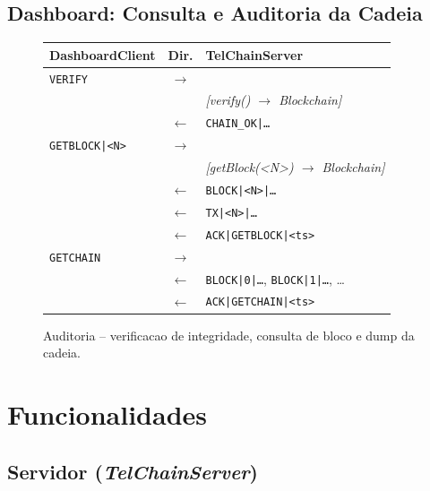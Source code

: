 \documentclass[12pt, a4paper]{article}
\begin{document}
\subsection{Dashboard: Consulta e Auditoria da Cadeia}

\begin{figure}[H]
\centering
\begin{tabular}{p{5cm} c p{5.5cm}}
\toprule
\textbf{DashboardClient} & \textbf{Dir.} & \textbf{TelChainServer} \\
\midrule
\texttt{VERIFY} & $\longrightarrow$ & \\
 & & \textit{[verify() $\to$ Blockchain]} \\
 & $\longleftarrow$ & \texttt{CHAIN\_OK|\ldots} \\
\midrule
\texttt{GETBLOCK|<N>} & $\longrightarrow$ & \\
 & & \textit{[getBlock(<N>) $\to$ Blockchain]} \\
 & $\longleftarrow$ & \texttt{BLOCK|<N>|\ldots} \\
 & $\longleftarrow$ & \texttt{TX|<N>|\ldots} \\
 & $\longleftarrow$ & \texttt{ACK|GETBLOCK|<ts>} \\
\midrule
\texttt{GETCHAIN} & $\longrightarrow$ & \\
 & $\longleftarrow$ & \texttt{BLOCK|0|\ldots}, \texttt{BLOCK|1|\ldots}, \ldots \\
 & $\longleftarrow$ & \texttt{ACK|GETCHAIN|<ts>} \\
\bottomrule
\end{tabular}
\caption{Auditoria -- verificacao de integridade, consulta de bloco e dump da cadeia.}
\label{fig:seq-audit}
\end{figure}

\section{Funcionalidades}

\subsection{Servidor (\textit{TelChainServer})}
\end{document}

